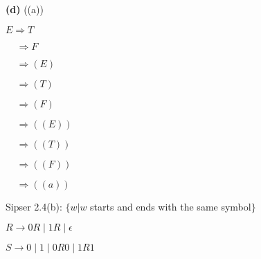 \documentclass[11pt]{article}
\newcommand{\question}[2] {\vspace{.25in} \fbox{#1} #2 \vspace{.10in}}
\renewcommand{\part}[1] {\vspace{.10in} {\bf (#1)}}
\begin{document}

\pagebreak

\part{d} ((a))

$E \Rightarrow T$

$\;\;\;\;\Rightarrow F$

$\;\;\;\;\Rightarrow (E)$

$\;\;\;\;\Rightarrow (T)$

$\;\;\;\;\Rightarrow (F)$

$\;\;\;\;\Rightarrow ((E))$

$\;\;\;\;\Rightarrow ((T))$

$\;\;\;\;\Rightarrow ((F))$

$\;\;\;\;\Rightarrow ((a))$


\question{6}{Sipser 2.4(b): $\{ w | w $ starts and ends with the same symbol$\}$ }

$ R \rightarrow 0 R \;|\; 1 R\; |\; \epsilon $


$ S \rightarrow 0\; |\; 1 \;|\; 0 R 0 \;|\; 1 R 1$
\end{document}
